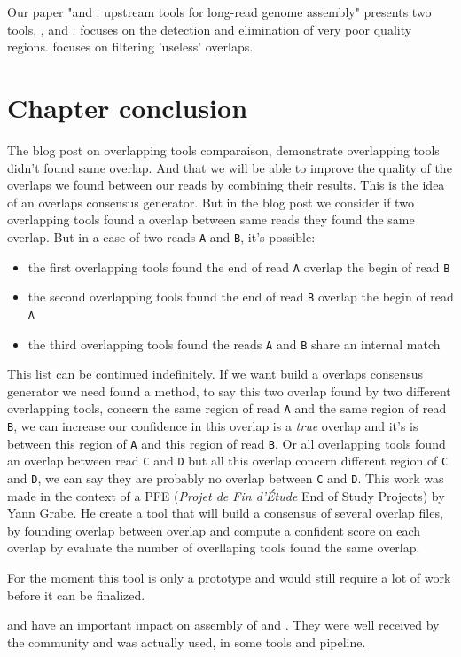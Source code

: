 \documentclass[main.tex]{subfiles}
\begin{document}
Our paper "\yacrd and \fpa: upstream tools for long-read genome assembly" presents two tools, \yacrd , and \fpa. \yacrd focuses on the detection and elimination of very poor quality regions. \fpa focuses on filtering 'useless' overlaps.





\section{Chapter conclusion}

The blog post on overlapping tools comparaison, demonstrate overlapping tools didn't found same overlap. And that we will be able to improve the quality of the overlaps we found between our reads by combining their results. This is the idea of an overlaps consensus generator. But in the blog post we consider if two overlapping tools found a overlap between same reads they found the same overlap. But in a case of two reads \texttt{A} and \texttt{B}, it's possible:
\begin{itemize}
    \item the first overlapping tools found the end of read \texttt{A} overlap the begin of read \texttt{B}
    \item the second overlapping tools found the end of read \texttt{B} overlap the begin of read \texttt{A}
    \item the third overlapping tools found the reads \texttt{A} and \texttt{B} share an internal match
\end{itemize}

This list can be continued indefinitely. If we want build a overlaps consensus generator we need found a method, to say this two overlap found by two different overlapping tools, concern the same region of read \texttt{A} and the same region of read \texttt{B}, we can increase our confidence in this overlap is a \textit{true} overlap and it's is between this region of \texttt{A} and this region of read \texttt{B}. Or all overlapping tools found an overlap between read \texttt{C} and \texttt{D} but all this overlap concern different region of \texttt{C} and \texttt{D}, we can say they are probably no overlap between \texttt{C} and \texttt{D}.
This work was made in the context of a PFE (\textit{Projet de Fin d'Étude} End of Study Projects) by Yann Grabe. He create a tool that will build a consensus of several overlap files, by founding overlap between overlap and compute a confident score on each overlap by evaluate the number of overllaping tools found the same overlap.

For the moment this tool is only a prototype and would still require a lot of work before it can be finalized. 

\yacrd and \fpa have an important impact on assembly of \miniasm and \wtdbg. They were well received by the community \yacrd and \fpa was actually used, in some tools and pipeline.


%
%
\end{document}

